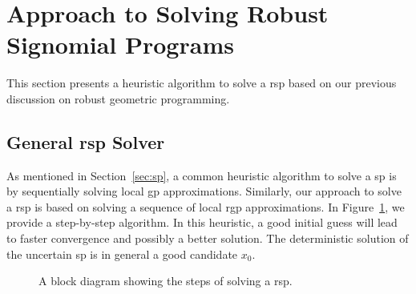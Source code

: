 \section{Approach to Solving Robust Signomial Programs}

This section presents a heuristic algorithm to solve a \gls{rsp}
based on our previous discussion on robust geometric programming.

\subsection{General \gls{rsp} Solver}
As mentioned in Section~\ref{sec:sp}, a common heuristic algorithm to solve a \gls{sp} is
by sequentially solving local \gls{gp} approximations.
Similarly, our approach to solve a \gls{rsp} is based on solving
a sequence of local \gls{rgp} approximations. In Figure~\ref{fig:rspsolve},
we provide a step-by-step algorithm.
In this heuristic, a good initial guess will lead to faster
convergence and possibly a better solution.
The deterministic solution of the uncertain \gls{sp} is in general a good candidate $x_0$.

\begin{figure}
    \begin{center}
    \caption{A block diagram showing the steps of solving a \gls{rsp}.}
        \label{fig:rspsolve}
\end{center}
\end{figure}

